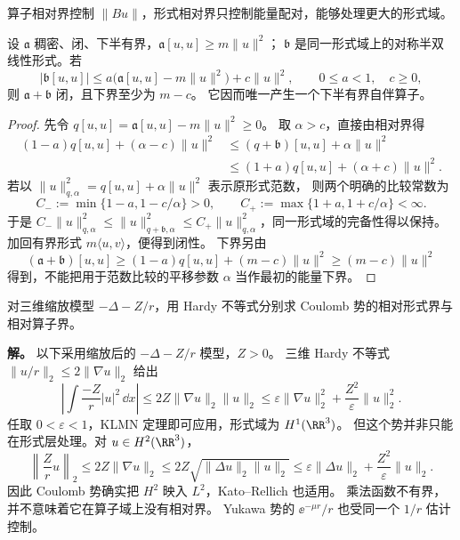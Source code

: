 算子相对界控制 $\|Bu\|$，形式相对界只控制能量配对，能够处理更大的形式域。
\begin{theorem}
设 $\mathfrak a$ 稠密、闭、下半有界，$\mathfrak a[u,u]\ge m\|u\|^2$；
$\mathfrak b$ 是同一形式域上的对称半双线性形式。若
\begin{equation}\label{eq:math-sl-klmn-bound}
|\mathfrak b[u,u]|
\le a\bigl(\mathfrak a[u,u]-m\|u\|^2\bigr)+c\|u\|^2,
\qquad 0\le a<1,\quad c\ge0,
\end{equation}
则 $\mathfrak a+\mathfrak b$ 闭，且下界至少为 $m-c$。
它因而唯一产生一个下半有界自伴算子。
\end{theorem}
\begin{proof}
先令 $q[u,u]=\mathfrak a[u,u]-m\|u\|^2\ge0$。
取 $\alpha>c$，直接由相对界得
\[
\begin{aligned}
(1-a)q[u,u]+(\alpha-c)\|u\|^2
&\le(q+\mathfrak b)[u,u]+\alpha\|u\|^2\\
&\le(1+a)q[u,u]+(\alpha+c)\|u\|^2.
\end{aligned}
\]
若以 $\|u\|_{q,\alpha}^2=q[u,u]+\alpha\|u\|^2$ 表示原形式范数，
则两个明确的比较常数为
\[
C_-:=\min\{1-a,1-c/\alpha\}>0,\qquad
C_+:=\max\{1+a,1+c/\alpha\}<\infty.
\]
于是 $C_-\|u\|_{q,\alpha}^2\le\|u\|_{q+\mathfrak b,\alpha}^2
\le C_+\|u\|_{q,\alpha}^2$，同一形式域的完备性得以保持。
加回有界形式 $m\langle u,v\rangle$，便得到闭性。
下界另由
\[
(\mathfrak a+\mathfrak b)[u,u]
\ge(1-a)q[u,u]+(m-c)\|u\|^2
\ge(m-c)\|u\|^2
\]
得到，不能把用于范数比较的平移参数 $\alpha$ 当作最初的能量下界。
\end{proof}

\begin{example}
对三维缩放模型 $-\Delta-Z/r$，用 Hardy 不等式分别求 Coulomb 势的相对形式界与相对算子界。

\textbf{解。} 以下采用缩放后的 $-\Delta-Z/r$ 模型，$Z>0$。
三维 Hardy 不等式 $\|u/r\|_2\le2\|\nabla u\|_2$ 给出
\[
\left|\int\frac{-Z}{r}|u|^2\,\dd x\right|
\le2Z\|\nabla u\|_2\|u\|_2
\le\varepsilon\|\nabla u\|_2^2+\frac{Z^2}{\varepsilon}\|u\|_2^2.
\]
任取 $0<\varepsilon<1$，KLMN 定理即可应用，形式域为 $H^1(\RR^3)$。
但这个势并非只能在形式层处理。对 $u\in H^2(\RR^3)$，
\[
\left\|\frac Zr u\right\|_2
\le2Z\|\nabla u\|_2
\le2Z\sqrt{\|\Delta u\|_2\|u\|_2}
\le\varepsilon\|\Delta u\|_2+\frac{Z^2}{\varepsilon}\|u\|_2.
\]
因此 Coulomb 势确实把 $H^2$ 映入 $L^2$，Kato--Rellich 也适用。
乘法函数不有界，并不意味着它在算子域上没有相对界。
Yukawa 势的 $\ee^{-\mu r}/r$ 也受同一个 $1/r$ 估计控制。
\end{example}

